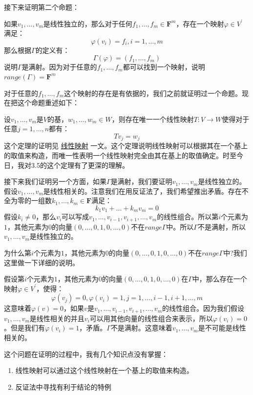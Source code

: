 \documentclass[10pt,a4paper,UTF8]{article}
\begin{document}
\begin{answer}
接下来证明第二个命题：

如果\(v_{1},\ldots ,v_{m}\)是线性独立的，那么对于任何\(f_{1},\ldots ,f_{m}\in \mathbf{F}^{m}\)，存在一个映射\(\varphi \in V^{'}\) 满足：
\[\varphi(v_{i}) = f_{i},i=1,\ldots ,m\]
那么根据\(\Gamma\)的定义有：\[\Gamma(\varphi) = (f_{1},\ldots ,f_{m})\] 说明\(\Gamma\)是满射。因为对于任意的\(f_{1},\ldots ,f_{m}\)都可以找到一个映射，说明\(range(\Gamma) = \mathbf{F}^{m}\)


对于任意的\(f_{1},\ldots ,f_{m}\)这个映射的存在是有依据的，我们之前就证明过一个命题。现在把这个命题重述如下：

设\(v_{1},\ldots ,v_{m}\)是\(V\)的基，\(w_{1},\ldots ,w_{m}\in W\)，则存在唯一一个线性映射\(T:V\rightarrow W\)使得对于任意\(j=1,\ldots ,n\)都有：\[Tv_{j}= w_{j}\]这个定理的证明见 \href{linear-map-on-vector-space.org}{线性映射} 一文。这个定理说明线性映射可以根据其在一个基上的取值来构造，而唯一性表明一个线性映射完全由其在基上的取值确定。时至今日，我对3.5的这个定理有了更深的理解。

接下来我们证明另一个方面，如果\(\Gamma\)是满射，我们要证明\(v_{1},\ldots ,v_{m}\)是线性独立的。假设\(v_{1},\ldots ,v_{m}\)是线性相关的。注意我们在用反证法了，我们希望推出矛盾。存在不全为零的一组数\(k_{1},\ldots ,k_{m}\in \mathbf{F}\)满足：\[k_{1}v_{1} + ... + k_{m}v_{m} = 0\] 假设\(k_{i}\neq 0\)，那么\(v_{i}\)可以写成\(v_{1},\ldots ,v_{i-1},v_{i+1},\ldots ,v_{m}\)的线性组合。所以第\(i\)个元素为\(1\)，其他元素为\(0\)的向量\((0,\ldots ,0,1,0,\ldots ,0)\)不在\(range \Gamma\)中。所以\(\Gamma\)不是满射，所以\(v_{1},\ldots ,v_{m}\)是线性独立的。

为什么第\(i\)个元素为\(1\)，其他元素为\(0\)的向量\((0,\ldots ,0,1,0,\ldots ,0)\)不在\(range \Gamma\)中?我们这里做一下详细的说明。

假设第\(i\)个元素为\(1\)，其他元素为\(0\)的向量\((0,\ldots ,0,1,0,\ldots ,0)\)在\(\Gamma\)中，那么存在一个映射\(\varphi\in V^{'}\)，使得：\[\varphi(v_{j}) = 0, \varphi(v_{i}) = 1,j = 1,\ldots ,i-1,i+1,\ldots ,m\] 这意味着\(\varphi(v) = 0\)，如果\(v\)是\(v_{1},\ldots ,v_{i-1},v_{i+1},\ldots ,v_{m}\)的线性组合。因为我们假设\(v_{1},\ldots ,v_{m}\)是线性相关的并且\(v_{i}\)可以用其他向量的线性组合来表示，所以\(\varphi(v_{i}) = 0\)。但是我们有\(\varphi(v_{i}) = 1\)，矛盾。\(\Gamma\)不是满射。这意味着\(v_{1},\ldots ,v_{m}\)是不可能是线性相关的。

这个问题在证明的过程中，我有几个知识点没有掌握：

\begin{enumerate}
\item 线性映射可以通过这个线性映射在一个基上的取值来构造。
\item 反证法中寻找有利于结论的特例
\end{enumerate}
\end{answer}
\end{document}
